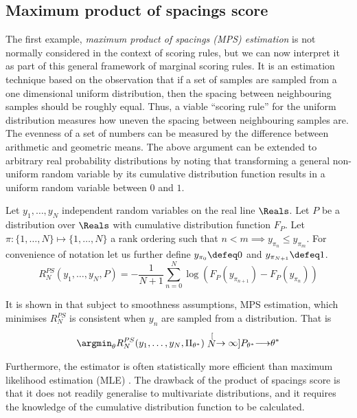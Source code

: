 \subsection{Maximum product of spacings score}

The first example, \emph{maximum product of spacings (MPS) estimation} is not normally considered in the context of scoring rules, but we can now interpret it as part of this general framework of marginal scoring rules. It is an estimation technique based on the observation that if a set of samples are sampled from a one dimensional uniform distribution, then the spacing between neighbouring samples should be roughly equal. Thus, a viable ``scoring rule'' for the uniform distribution measures how uneven the spacing between neighbouring samples are. The evenness of a set of numbers can be measured by the difference between arithmetic and geometric means. The above argument can be extended to arbitrary real probability distributions by noting that transforming a general non-uniform random variable by its cumulative distribution function results in a uniform random variable between $0$ and $1$.

\begin{definition}
	Let $y_1,\ldots,y_N$ independent random variables on the real line $\Reals$. Let $P$ be a distribution over $\Reals$ with cumulative distribution function $F_{P}$. Let $\pi:\{1,\ldots,N\}\mapsto\{1,\ldots,N\}$ a rank ordering such that $n<m \implies y_{\pi_{n}}\leq y_{\pi_{m}}$. For convenience of notation let us further define $y_{\pi_0}\defeq 0$ and $y_{\pi_{N+1}}\defeq 1$.
	\begin{equation}
		R^{PS}_N(y_1,\ldots,y_N,P) = - \frac{1}{N+1} \sum_{n=0}^{N} \log \left(F_P\left(y_{\pi_{n+1}}\right) - F_P\left(y_{\pi_{n}}\right) \right)
	\end{equation}
\end{definition}

It is shown in \citep{http://fir.nes.ru/tildegkosenok/MPS.pdf} that subject to smoothness assumptions, MPS estimation, which minimises $R^{PS}_N$ is consistent when $y_n$ are sampled \iid from a distribution. That is
\begin{align}
\argmin_{\theta}R^{PS}_{N}(y_1,\ldots,y_N,\Pi_{\theta^{*}}) \stackrel[N\rightarrow\infty]{P_{\theta^{*}}}{\longrightarrow} \theta^{*}
\end{align}

Furthermore, the estimator is often statistically more efficient than maximum likelihood estimation (MLE) \citep{http://fir.nes.ru/tildegkosenok/MPS.pdf}. The drawback of the product of spacings score is that it does not readily generalise to multivariate distributions, and it requires the knowledge of the cumulative distribution function to be calculated.

